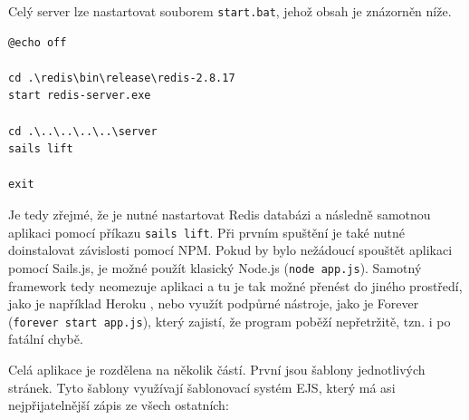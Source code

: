 \begin{figure}[H]
\end{figure}

Celý server lze nastartovat souborem \texttt{start.bat}, jehož obsah je zná\-zor\-něn níže.

\begin{verbatim}
@echo off

cd .\redis\bin\release\redis-2.8.17
start redis-server.exe

cd .\..\..\..\..\server
sails lift

exit
\end{verbatim}

Je tedy zřejmé, že je nutné nastartovat Redis databázi a následně samotnou aplikaci pomocí příkazu \texttt{sails lift}. Při prvním spuštění je také nutné doinstalovat závislosti pomocí NPM. Pokud by bylo nežádoucí spouštět aplikaci pomocí Sails.js, je možné použít klasický Node.js (\texttt{node app.js}). Samotný framework tedy neomezuje aplikaci a tu je tak možné přenést do jiného prostředí, jako je například Heroku \cite{heroku}, nebo využít podpůrné nástroje, jako je Forever \cite{forever} (\texttt{forever start app.js}), který zajistí, že program poběží nepřetržitě, tzn. i po fatální chybě.

Celá aplikace je rozdělena na několik částí. První jsou šablony jednotlivých stránek. Tyto šablony využívají šablonovací systém EJS, který má asi nejpřijatelnější zápis ze všech ostatních:

